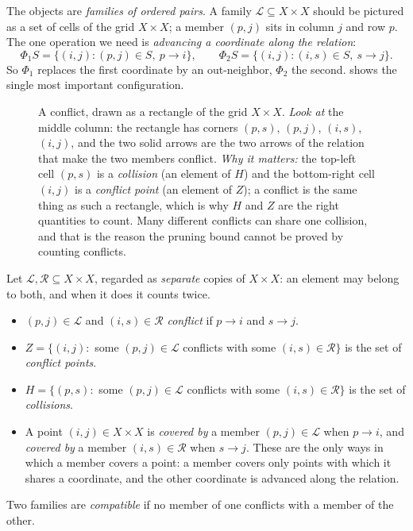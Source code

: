 The objects are \emph{families of ordered pairs}. A family $\mathcal L\subseteq X\times X$ should be
pictured as a set of cells of the grid $X\times X$; a member $(p,j)$ sits in column $j$ and row $p$.
The one operation we need is \emph{advancing a coordinate along the relation}:
\begin{equation}\label{eq:Phi}
 \Phi_1 S=\{(i,j):(p,j)\in S,\ p\to i\},\qquad
 \Phi_2 S=\{(i,j):(i,s)\in S,\ s\to j\}.
\end{equation}
So $\Phi_1$ replaces the first coordinate by an out-neighbor, $\Phi_2$ the second.
 shows the single most important configuration.

\begin{figure}[t]
\centering

\caption{A conflict, drawn as a rectangle of the grid $X\times X$. \emph{Look at} the middle column:
 the rectangle has corners $(p,s)$, $(p,j)$, $(i,s)$, $(i,j)$, and the two solid arrows are the two
 arrows of the relation that make the two members conflict. \emph{Why it matters:} the top-left cell
 $(p,s)$ is a \emph{collision} (an element of $H$) and the bottom-right cell $(i,j)$ is a
 \emph{conflict point} (an element of $Z$); a conflict is the same thing as such a rectangle, which
 is why $H$ and $Z$ are the right quantities to count. Many different conflicts can share one
 collision, and that is the reason the pruning bound cannot be proved by counting conflicts.}
\label{fig:conflict}
\end{figure}

\begin{definition}\label{def:conflict}
Let $\mathcal L,\mathcal R\subseteq X\times X$, regarded as \emph{separate} copies of $X\times X$:
an element may belong to both, and when it does it counts twice.
\begin{itemize}[leftmargin=1.4em,itemsep=1pt,topsep=1pt]
\item $(p,j)\in\mathcal L$ and $(i,s)\in\mathcal R$ \emph{conflict} if $p\to i$ and $s\to j$.
\item $Z=\{(i,j):$ some $(p,j)\in\mathcal L$ conflicts with some $(i,s)\in\mathcal R\}$ is the set of
  \emph{conflict points}.
\item $H=\{(p,s):$ some $(p,j)\in\mathcal L$ conflicts with some $(i,s)\in\mathcal R\}$ is the set of
  \emph{collisions}.
\item A point $(i,j)\in X\times X$ is \emph{covered by} a member $(p,j)\in\mathcal L$ when $p\to i$,
  and \emph{covered by} a member $(i,s)\in\mathcal R$ when $s\to j$. These are the only ways in which
  a member covers a point: a member covers only points with which it shares a coordinate, and the
  other coordinate is advanced along the relation.
\end{itemize}
Two families are \emph{compatible} if no member of one conflicts with a member of the other.
\end{definition}

